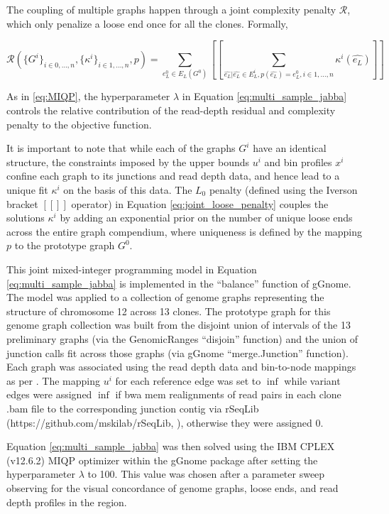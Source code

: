 \documentclass[phd,tocprelim]{cornell}
\begin{document}
The coupling of multiple graphs happen through a joint complexity penalty $\mathcal{R}$, which only penalize a loose end once for all the clones. Formally,

\begin{equation} \label{eq:joint_loose_penalty}
    \mathcal{R}(\{G^i\}_{i \in 0, \dots, n}, \{\kappa^i\}_{i \in 1, \dots, n}, p) = \sum_{e^{0}_{L} \in E_{L}(G^0)}[\![ \sum_{\hat{e_L}|\hat{e_L} \in E^{i}_{L}, p(\hat{e_L})=e^{0}_{L}, i \in 1,\dots,n} \kappa^i( \hat{e_L} ) ]\!]
\end{equation}

As in \ref{eq:MIQP}, the hyperparameter $\lambda$ in Equation \ref{eq:multi_sample_jabba} controls the relative contribution of the read-depth residual and complexity penalty to the objective function. 

It is important to note that while each of the graphs $G^i$ have an identical structure, the constraints imposed by the upper bounds $u^i$ and bin profiles $x^i$ confine each graph to its junctions and read depth data, and hence lead to a unique fit $κ^i$ on the basis of this data. The $L_0$ penalty (defined using the Iverson bracket $[\![]\!]$ operator) in Equation \ref{eq:joint_loose_penalty} couples the solutions $κ^i$ by adding an exponential prior on the number of unique loose ends across the entire graph compendium, where uniqueness is defined by the mapping $p$ to the prototype graph $G^0$.

This joint mixed-integer programming model in Equation \ref{eq:multi_sample_jabba} is implemented in the “balance” function of gGnome. The model was applied to a collection of genome graphs representing the structure of chromosome 12 across 13 clones. The prototype graph for this genome graph collection was built from the disjoint union of intervals of the 13 preliminary graphs (via the GenomicRanges “disjoin” function) and the union of junction calls fit across those graphs (via gGnome “merge.Junction” function). Each graph was associated using the read depth data and bin-to-node mappings as per \cite{Hadi2020-um}. The mapping $u^i$ for each reference edge was set to $\inf$ while variant edges were assigned $\inf$ if bwa mem realignments of read pairs in each clone .bam file to the corresponding junction contig via rSeqLib (https://github.com/mskilab/rSeqLib, \cite{Wala2017-ud}), otherwise they were assigned 0.

Equation \ref{eq:multi_sample_jabba} was then solved using the IBM CPLEX (v12.6.2) MIQP optimizer within the gGnome package after setting the hyperparameter $\lambda$ to 100.  This value was chosen after a parameter sweep observing for the visual concordance of genome graphs, loose ends, and read depth profiles in the region.
\end{document}

